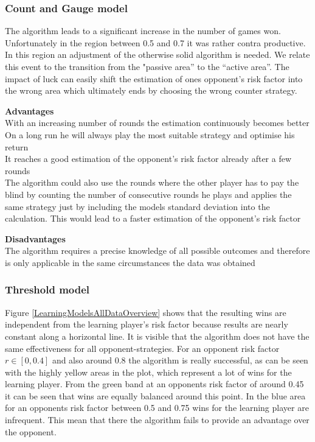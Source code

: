 \documentclass[11pt]{article}
\begin{document}
\subsubsection{Count and Gauge model}
The algorithm leads to a significant increase in the number of games won. Unfortunately in the region between 0.5 and 0.7 it was rather contra productive. In this region an adjustment of the otherwise solid algorithm is needed.
We relate this event to the transition from the "passive area” to the “active area”. The impact of luck can easily shift the estimation of ones opponent's risk factor into the wrong area which ultimately ends by choosing the wrong counter strategy.\\


\begin{minipage}[t]{0.48\textwidth}
\textbf{Advantages}\\
With an increasing number of rounds the estimation continuously becomes better\\
On a long run he will always play the most suitable strategy and optimise his return\\
It reaches a good estimation of the opponent's risk factor already after a few rounds\\
The algorithm could also use the rounds where the other player has to pay the blind by counting the number of consecutive rounds he plays and applies the same strategy just by including the models standard deviation into the calculation. This would lead to a faster estimation of the opponent's risk factor
\end{minipage}\hfill
\begin{minipage}[t]{0.48\textwidth}
\textbf{Disadvantages}\\
The algorithm requires a precise knowledge of all possible outcomes and therefore is only applicable in the same circumstances the data was obtained\\
\end{minipage}

\subsubsection{Threshold model}

Figure \ref{LearningModelsAllDataOverview} shows that the resulting wins are independent from the learning player's risk factor because results are nearly constant along a horizontal line. It is visible that the algorithm does not have the same effectiveness for all opponent-strategies. For an opponent risk factor $r \in [0,0.4]$  and also around 0.8 the algorithm is really successful, as can be seen with the highly yellow areas in the plot, which represent a lot of wins for the learning player. From the green band at an opponents risk factor of around 0.45 it can be seen that wins are equally balanced around this point. In the blue area for an opponents risk factor between 0.5 and 0.75 wins for the learning player are infrequent. This mean that there the algorithm fails to provide an advantage over the opponent.\\
\end{document}
